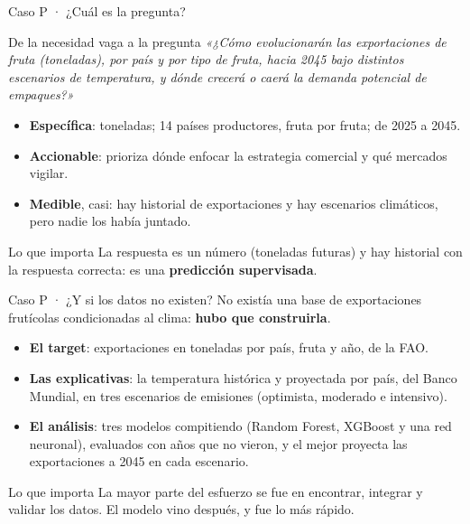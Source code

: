 \documentclass{beamer}
\begin{document}
\begin{frame}{Caso P · ¿Cuál es la pregunta?}
\small
\begin{block}{De la necesidad vaga a la pregunta}
\centering
\emph{«¿Cómo evolucionarán las exportaciones de fruta (toneladas), por país y por tipo de fruta, hacia 2045 bajo distintos escenarios de temperatura, y dónde crecerá o caerá la demanda potencial de empaques?»}
\end{block}

\vspace{0.1cm}
\footnotesize
\begin{itemize} \setlength{\itemsep}{0.08cm}
  \item \textcolor{verdeok}{\textbf{Específica}}: toneladas; 14 países productores, fruta por fruta; de 2025 a 2045.
  \item \textcolor{verdeok}{\textbf{Accionable}}: prioriza dónde enfocar la estrategia comercial y qué mercados vigilar.
  \item \textcolor{verdeok}{\textbf{Medible}}, casi: hay historial de exportaciones y hay escenarios climáticos, pero nadie los había juntado.
\end{itemize}
\begin{alertblock}{Lo que importa}
La respuesta es un número (toneladas futuras) y hay historial con la respuesta correcta: es una \textbf{predicción supervisada}.
\end{alertblock}
\end{frame}

\begin{frame}{Caso P · ¿Y si los datos no existen?}
\small
No existía una base de exportaciones frutícolas condicionadas al clima: \textbf{hubo que construirla}.
\begin{itemize} \setlength{\itemsep}{0.1cm}
  \item \textbf{El target}: exportaciones en toneladas por país, fruta y año, de la FAO.
  \item \textbf{Las explicativas}: la temperatura histórica y proyectada por país, del Banco Mundial, en tres escenarios de emisiones (optimista, moderado e intensivo).
  \item \textbf{El análisis}: tres modelos compitiendo (Random Forest, XGBoost y una red neuronal), evaluados con años que no vieron, y el mejor proyecta las exportaciones a 2045 en cada escenario.
\end{itemize}
\begin{alertblock}{Lo que importa}
La mayor parte del esfuerzo se fue en encontrar, integrar y validar los datos. El modelo vino después, y fue lo más rápido.
\end{alertblock}
\end{frame}
\end{document}
